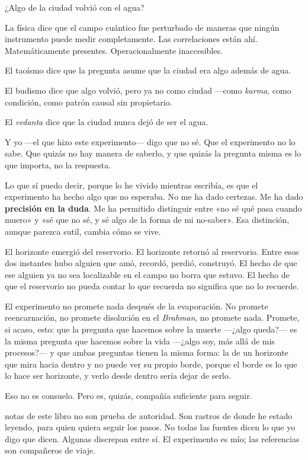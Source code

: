 ¿Algo de la ciudad volvió con el agua?

La física dice que el campo cuántico fue perturbado de maneras que ningún instrumento puede medir completamente. Las correlaciones están ahí. Matemáticamente presentes. Operacionalmente inaccesibles.

El taoísmo dice que la pregunta asume que la ciudad era algo además de agua.

El budismo dice que algo volvió, pero ya no como ciudad —como \emph{karma}, como condición, como patrón causal sin propietario.

El \emph{vedanta} dice que la ciudad nunca dejó de ser el agua.

Y yo —el que hizo este experimento— digo que no sé. Que el experimento no lo sabe. Que quizás no hay manera de saberlo, y que quizás la pregunta misma es lo que importa, no la respuesta.

Lo que sí puedo decir, porque lo he vivido mientras escribía, es que el experimento ha hecho algo que no esperaba. No me ha dado certezas. Me ha dado \textbf{precisión en la duda}. Me ha permitido distinguir entre «no sé qué pasa cuando muero» y «sé que no sé, y sé algo de la forma de mi no-saber». Esa distinción, aunque parezca sutil, cambia cómo se vive.

El horizonte emergió del reservorio. El horizonte retornó al reservorio. Entre esos dos instantes hubo alguien que amó, recordó, perdió, construyó. El hecho de que ese alguien ya no sea localizable en el campo no borra que estuvo. El hecho de que el reservorio no pueda contar lo que recuerda no significa que no lo recuerde.

El experimento no promete nada después de la evaporación. No promete reencarnación, no promete disolución en el \emph{Brahman}, no promete nada. Promete, si acaso, esto: que la pregunta que hacemos sobre la muerte —¿algo queda?— es la misma pregunta que hacemos sobre la vida —¿algo soy, más allá de mis procesos?— y que ambas preguntas tienen la misma forma: la de un horizonte que mira hacia dentro y no puede ver su propio borde, porque el borde es lo que lo hace ser horizonte, y verlo desde dentro sería dejar de serlo.

Eso no es consuelo. Pero es, quizás, compañía suficiente para seguir.

\backmatter
{}
\noindent {} notas de este libro no son prueba de autoridad. Son rastros de donde he estado leyendo, para quien quiera seguir los pasos. No todas las fuentes dicen lo que yo digo que dicen. Algunas discrepan entre sí. El experimento es mío; las referencias son compañeros de viaje.

